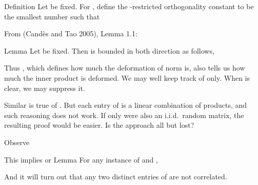 \startsection [title={Confirming the Restricted Isometry of \m {P}}]

\Result
{Definition}
{
Let  be fixed.
For , define the -restricted orthogonality constant  to be the smallest number such that
}

From  (Cand\`es and Tao 2005), Lemma 1.1:

\Result
{Lemma}
{
Let  be fixed.
Then  is bounded in both direction as follows,
}

Thus , which defines how much the deformation of norm is, also tells us how much the inner product is deformed.
We may well keep track of  only.
When  is clear, we may suppress it.

Similar is true of .
But each entry of  is a linear combination of products, and such reasoning does not work.
If only  were also an i.i.d.\ random matrix, the resulting proof would be easier.
Is the approach all but lost?

Observe

This implies
or
\Result
{Lemma}
{
For any instance of  and ,
}

And it will turn out that any two distinct entries of  are not correlated.

